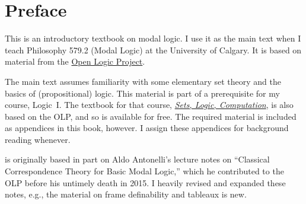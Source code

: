 
\chapter{Preface}

This is an introductory textbook on modal logic. I use it as the main
text when I teach Philosophy 579.2 (Modal Logic) at the University of
Calgary. It is based on material from the
\href{https://openlogicproject.org}{Open Logic Project}.

The main text assumes familiarity with some elementary set theory and
the basics of (propositional) logic. This material is part of a
prerequisite for my course, Logic~I. The textbook for that course,
\href{https://slc.openlogicproject.org}{\emph{Sets, Logic,
Computation}}, is also based on the OLP, and so is available for free.
The required material is included as appendices in this book,
however. I assign these appendices for background reading whenever.

 is originally based in part on Aldo Antonelli's
lecture notes on ``Classical Correspondence Theory for Basic Modal
Logic,'' which he contributed to the OLP before his untimely death in
2015. I heavily revised and expanded these notes, e.g., the material
on frame definability and tableaux is new.